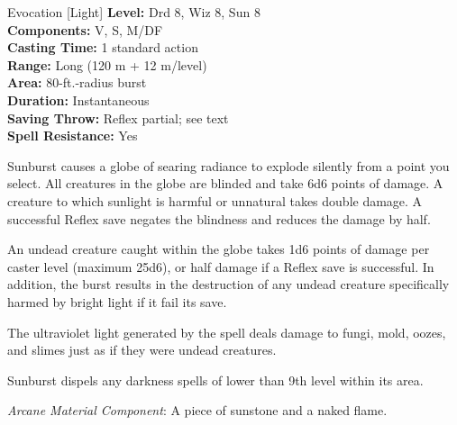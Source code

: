 {Evocation [Light]}
{
	\textbf{Level:}
	Drd 8, Wiz 8, Sun 8\\
	\textbf{Components:}
	V, S, M/DF\\
	\textbf{Casting Time:}
	1 standard action\\
	\textbf{Range:}
	Long (120 m + 12 m/level)\\
	\textbf{Area:}
	80-ft.-radius burst\\
	\textbf{Duration:}
	Instantaneous\\
	\textbf{Saving Throw:}
	Reflex partial; see text\\
	\textbf{Spell Resistance:}
	Yes\\
}
{
	Sunburst causes a globe of searing radiance to explode silently from a point you select. All creatures in the globe are blinded and take 6d6 points of damage. A creature to which sunlight is harmful or unnatural takes double damage. A successful Reflex save negates the blindness and reduces the damage by half.

	An undead creature caught within the globe takes 1d6 points of damage per caster level (maximum 25d6), or half damage if a Reflex save is successful. In addition, the burst results in the destruction of any undead creature specifically harmed by bright light if it fail its save.

	The ultraviolet light generated by the spell deals damage to fungi, mold, oozes, and slimes just as if they were undead creatures.

	Sunburst dispels any darkness spells of lower than 9th level within its area.

	\textit{Arcane Material Component}:
	A piece of sunstone and a naked flame.

}
